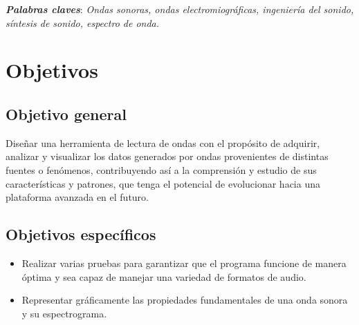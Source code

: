 \documentclass[letterpaper, 12pt]{article}
\newcommand{\bolditalic}[1]{\textbf{\textit{#1}}}
\begin{document}

\noindent\makebox[\linewidth]{\rule{\linewidth}{0.4pt}}

\bolditalic{Palabras claves}: \textit{Ondas sonoras, ondas electromiográficas,
	ingeniería del sonido, síntesis de sonido, espectro de
	onda.}

\noindent\makebox[\linewidth]{\rule{\linewidth}{0.4pt}}

\section*{Objetivos}

\subsection*{Objetivo general}

Diseñar una herramienta de lectura de ondas con el
propósito de adquirir, analizar y visualizar los datos
generados por ondas provenientes de distintas fuentes o
fenómenos, contribuyendo así a la comprensión y estudio de
sus características y patrones, que tenga el potencial de
evolucionar hacia una plataforma avanzada en el futuro.

\subsection*{Objetivos específicos}

\begin{itemize}[label=$\triangleright$]
	\item Realizar varias pruebas para garantizar que el programa
	      funcione de manera óptima y sea capaz de manejar una
	      variedad de formatos de audio.

	\item Representar gráficamente las propiedades fundamentales de
	      una onda sonora y su espectrograma.
\end{itemize}

\end{document}
